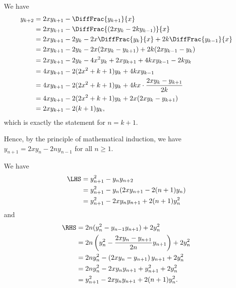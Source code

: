 \begin{enumerate}
          We have
          \begin{align*}
              y_{k + 2} & = 2 x y_{k + 1} - \DiffFrac{y_{k + 1}}{x}                                          \\
                        & = 2 x y_{k + 1} - \DiffFrac{\left(2 x y_k - 2 k y_{k - 1}\right)}{x}               \\
                        & = 2 x y_{k + 1} - 2 y_k - 2 x \DiffFrac{y_k}{x} + 2k \DiffFrac{y_{k - 1}}{x}       \\
                        & = 2 x y_{k + 1} - 2 y_k - 2 x (2 x y_k -  y_{k + 1}) + 2k (2x y_{k - 1} - y_k)     \\
                        & = 2 x y_{k + 1} - 2 y_k - 4x^2 y_k + 2 x y_{k + 1} + 4 k x y_{k - 1} - 2k y_k      \\
                        & = 4x y_{k + 1} - 2 (2x^2 + k + 1) y_k + 4 k x y_{k - 1}                            \\
                        & = 4x y_{k + 1} - 2 (2x^2 + k + 1) y_k + 4 k x \cdot \frac{2 x y_k - y_{k + 1}}{2k} \\
                        & = 4x y_{k + 1} - 2 (2x^2 + k + 1) y_k + 2x (2 x y_k - y_{k + 1})                   \\
                        & = 2x y_{k + 1} - 2 (k + 1) y_k,
          \end{align*}
          which is exactly the statement for \(n = k + 1\).

          Hence, by the principle of mathematical induction, we have \(y_{n + 1} = 2 x y_n - 2n y_{n - 1}\) for all \(n \geq 1\).

          We have
          \begin{align*}
              \LHS & = y_{n + 1}^2 - y_n y_{n + 2}                       \\
                   & = y_{n + 1}^2 - y_n (2 x y_{n + 1} - 2 (n + 1) y_n) \\
                   & = y_{n + 1}^2 - 2 x y_n y_{n + 1} + 2 (n + 1) y_n^2
          \end{align*}
          and
          \begin{align*}
              \RHS & = 2n (y_n^2 - y_{n - 1} y_{n + 1}) + 2 y_n^2                                \\
                   & = 2n \left(y_n^2 - \frac{2x y_n - y_{n + 1}}{2n} y_{n + 1}\right) + 2 y_n^2 \\
                   & = 2n y_n^2 - \left(2x y_n - y_{n + 1}\right) y_{n + 1} + 2 y_n^2            \\
                   & = 2n y_n^2 - 2x y_n y_{n + 1} + y_{n + 1}^2 + 2 y_n^2                       \\
                   & = y_{n + 1}^2 - 2x y_n y_{n + 1} + 2 (n + 1) y_n^2.
          \end{align*}


\end{enumerate}
